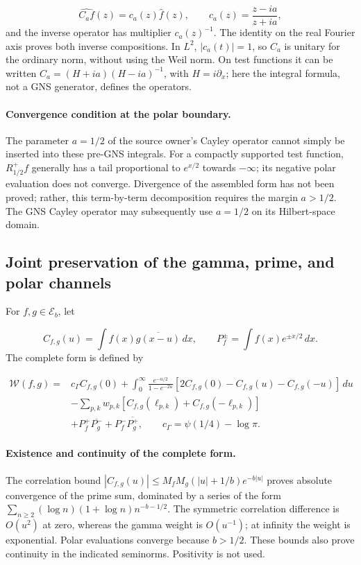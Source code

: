 \[
\widehat{C_af}(z)=c_a(z)\widehat f(z),\qquad
c_a(z)=\frac{z-ia}{z+ia},
\]
and the inverse operator has multiplier \(c_a(z)^{-1}\). The identity on the real Fourier axis proves both inverse compositions. In \(L^2\), \(|c_a(t)|=1\), so \(C_a\) is unitary for the ordinary norm, without using the Weil norm. On test functions it can be written \(C_a=(H+ia)(H-ia)^{-1}\), with \(H=i\partial_x\); here the integral formula, not a GNS generator, defines the operators.

\paragraph{Convergence condition at the polar boundary.} The parameter \(a=1/2\) of the source owner's Cayley operator cannot simply be inserted into these pre-GNS integrals. For a compactly supported test function, \(R_{1/2}^+f\) generally has a tail proportional to \(e^{x/2}\) towards \(-\infty\); its negative polar evaluation does not converge. Divergence of the assembled form has not been proved; rather, this term-by-term decomposition requires the margin \(a>1/2\). The GNS Cayley operator may subsequently use \(a=1/2\) on its Hilbert-space domain.


\subsection{Joint preservation of the gamma, prime, and polar channels}
\label{tm-add-m5}
For \(f,g\in\mathscr E_b\), let

\[
C_{f,g}(u)=\int f(x)\overline{g(x-u)}\,dx,
\qquad P_f^\pm=\int f(x)e^{\pm x/2}\,dx.
\]
The complete form is defined by

\[
\begin{aligned}
\mathscr W(f,g)={}&c_\Gamma C_{f,g}(0)
+\int_0^\infty\frac{e^{-u/2}}{1-e^{-2u}}
 [2C_{f,g}(0)-C_{f,g}(u)-C_{f,g}(-u)]\,du\\
&-\sum_{p,k}w_{p,k}
 [C_{f,g}(\ell_{p,k})+C_{f,g}(-\ell_{p,k})]\\
&+P_f^+\overline{P_g^-}+P_f^-\overline{P_g^+},
\qquad c_\Gamma=\psi(1/4)-\log\pi.
\end{aligned}
\]
\paragraph{Existence and continuity of the complete form.} The correlation bound \(|C_{f,g}(u)|\le M_fM_g(|u|+1/b)e^{-b|u|}\) proves absolute convergence of the prime sum, dominated by a series of the form \(\sum_{n\ge2}(\log n)(1+\log n)n^{-b-1/2}\). The symmetric correlation difference is \(O(u^2)\) at zero, whereas the gamma weight is \(O(u^{-1})\); at infinity the weight is exponential. Polar evaluations converge because \(b>1/2\). These bounds also prove continuity in the indicated seminorms. Positivity is not used.

